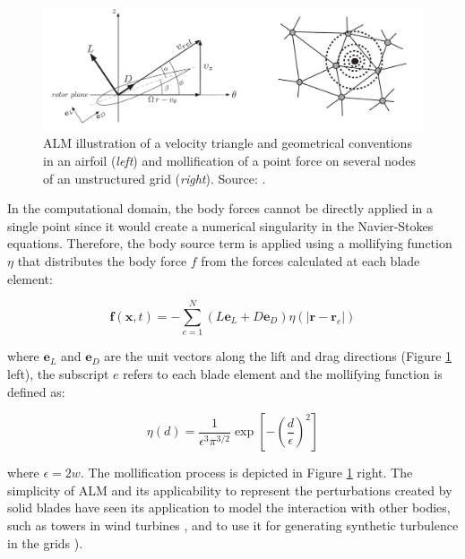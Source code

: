 \begin{figure}[h!]
	\centering
	\includegraphics[scale=0.4]{./part2_developments/figures_ch4_SLI/ALM_airfoil_and_mollification_benard}
	\caption[ALM illustration of a velocity triangle and geometrical conventions in an airfoil and mollification of a point force on several nodes of an unstructured grid]{ALM illustration of a velocity triangle and geometrical conventions in an airfoil (\textsl{left}) and mollification of a point force on several nodes of an unstructured grid (\textsl{right}). Source: .}
	\label{fig:ALM_airfoil_and_mollification_benard}
\end{figure} 
 

In the computational domain, the body forces cannot be directly applied in a single point since it would create a numerical singularity in the Navier-Stokes equations. Therefore, the body source term is applied using a mollifying function $\eta$ that distributes the body force $f$ from the forces calculated at each blade element:

\begin{equation}
\textbf{f} \left( \textbf{x}, t \right) = - \sum_{e=1}^{N} \left( L \textbf{e}_L + D \textbf{e}_D \right) \eta \left( |\textbf{r} - \textbf{r}_e| \right)
\end{equation}

where $\textbf{e}_L$ and $\textbf{e}_D$ are the unit vectors along the lift and drag directions (Figure \ref{fig:ALM_airfoil_and_mollification_benard} left), the subscript $e$ refers to each blade element and the mollifying function is defined as:

\begin{equation}
\eta \left( d \right) = \frac{1}{\epsilon^3 \pi^{3/2}} \exp \left[ - \left( \frac{d}{\epsilon} \right)^2 \right]
\end{equation}

where $\epsilon = 2 w$. The mollification process is depicted in Figure \ref{fig:ALM_airfoil_and_mollification_benard} right. The simplicity of ALM and its applicability to represent the perturbations created by solid blades have seen its application to model the interaction with other bodies, such as towers in wind turbines , and to use it for generating synthetic turbulence in the grids ).

